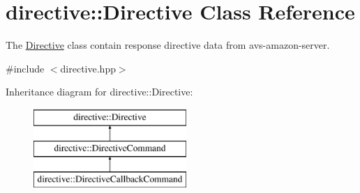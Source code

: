 \hypertarget{classdirective_1_1Directive}{}\section{directive\+:\+:Directive Class Reference}
\label{classdirective_1_1Directive}


The \hyperlink{classdirective_1_1Directive}{Directive} class contain response directive data from avs-\/amazon-\/server.  




{\ttfamily \#include $<$directive.\+hpp$>$}

Inheritance diagram for directive\+:\+:Directive\+:\begin{figure}[H]
\begin{center}
\leavevmode
\includegraphics[height=3.000000cm]{df/de5/classdirective_1_1Directive}
\end{center}
\end{figure}
